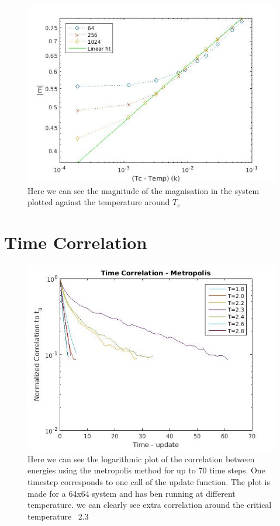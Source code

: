 \documentclass[11pt]{article}
\begin{document}
\begin{figure}[H]
	\centering
	\includegraphics[width=1\textwidth]{../../plots/clusterPlot}
	\caption{Here we can see the magnitude of the magnisation in the system plotted against the temperature around $T_c$}
	\label{fig:clusterPlot}
\end{figure}

\section{Time Correlation}

\begin{figure}[H]
	\centering
	\includegraphics[width=1\textwidth]{../../plots/timeCorrMetro}
	\caption{Here we can see the logarithmic plot of the correlation between energies using the metropolis method for up to 70 time steps. One timestep corresponds to one call of the update function. The plot is made for a 64x64 system and has ben running at different temperature. we can clearly see extra correlation around the critical temperature ~2.3}
	\label{fig:timeCorrMetro}
\end{figure}
\end{document}
